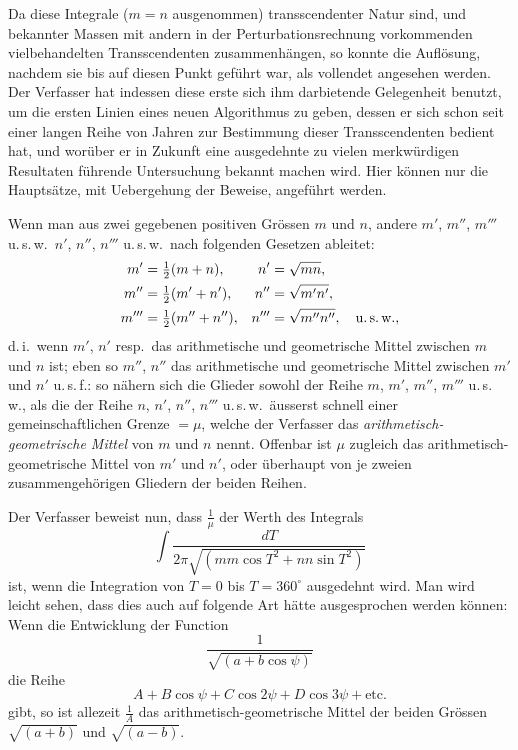 \documentclass[12pt,a4paper]{article}
\begin{document}
Da diese Integrale ($m=n$ ausgenommen) transscendenter Natur sind, und bekannter Massen mit andern in der Perturbationsrechnung vorkommenden vielbehandelten Transscendenten zusammenh\"angen, so konnte die Aufl\"osung, nachdem sie bis auf diesen Punkt gef\"uhrt war, als vollendet angesehen werden. Der Verfasser hat indessen diese erste sich ihm darbietende Gelegenheit benutzt, um die ersten Linien eines neuen Algorithmus zu geben, dessen er sich schon seit einer langen Reihe von Jahren zur Bestimmung dieser Transscendenten bedient hat, und wor\"uber er in Zukunft eine ausgedehnte zu vielen merkw\"urdigen Resultaten f\"uhrende Untersuchung bekannt machen wird. Hier k\"onnen nur die Haupts\"atze, mit Uebergehung der Beweise, angef\"uhrt werden.

Wenn man aus zwei gegebenen positiven Gr\"ossen $m$ und $n$, andere $m'$, $m''$, $m'''$ u.\,s.\,w.\ $n'$, $n''$, $n'''$ u.\,s.\,w.\ nach folgenden Gesetzen ableitet:
\[
\begin{aligned}
m' &= \tfrac{1}{2}(m+n), & n' &= \sqrt{mn}, \\
m'' &= \tfrac{1}{2}(m'+n'), & n'' &= \sqrt{m'n'}, \\
m''' &= \tfrac{1}{2}(m''+n''), & n''' &= \sqrt{m''n''}, \quad\text{u.\,s.\,w.,}
\end{aligned}
\]
d.\,i.\ wenn $m'$, $n'$ resp.\ das arithmetische und geometrische Mittel zwischen $m$ und $n$ ist; eben so $m''$, $n''$ das arithmetische und geometrische Mittel zwischen $m'$ und $n'$ u.\,s.\,f.: so n\"ahern sich die Glieder sowohl der Reihe $m$, $m'$, $m''$, $m'''$ u.\,s.\,w., als die der Reihe $n$, $n'$, $n''$, $n'''$ u.\,s.\,w.\ \"ausserst schnell einer gemeinschaftlichen Grenze $=\mu$, welche der Verfasser das \textit{arithmetisch-geometrische Mittel} von $m$ und $n$ nennt. Offenbar ist $\mu$ zugleich das arithmetisch-geometrische Mittel von $m'$ und $n'$, oder \"uberhaupt von je zweien zusammengeh\"origen Gliedern der beiden Reihen.

Der Verfasser beweist nun, dass $\frac{1}{\mu}$ der Werth des Integrals
\[
\int\frac{dT}{2\pi\sqrt{(mm\cos T^2 + nn\sin T^2)}}
\]
ist, wenn die Integration von $T=0$ bis $T=360^{\circ}$ ausgedehnt wird. Man wird leicht sehen, dass dies auch auf folgende Art h\"atte ausgesprochen werden k\"onnen: Wenn die Entwicklung der Function
\[
\frac{1}{\sqrt{(a+b\cos\psi)}}
\]
die Reihe
\[
A + B\cos\psi + C\cos 2\psi + D\cos 3\psi + \text{etc.}
\]
gibt, so ist allezeit $\frac{1}{A}$ das arithmetisch-geometrische Mittel der beiden Gr\"ossen $\sqrt{(a+b)}$ und $\sqrt{(a-b)}$.
\end{document}
